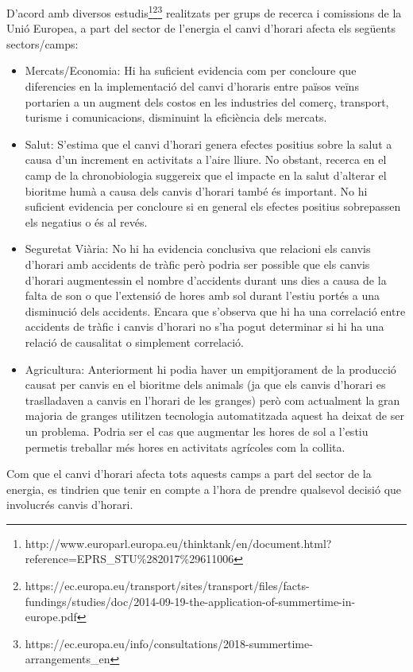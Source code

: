 \documentclass{article}
\begin{document}
D'acord amb diversos estudis\footnote{http://www.europarl.europa.eu/thinktank/en/document.html?reference=EPRS\_STU\%282017\%29611006}\footnote{https://ec.europa.eu/transport/sites/transport/files/facts-fundings/studies/doc/2014-09-19-the-application-of-summertime-in-europe.pdf}\footnote{\label{eu-consultation}https://ec.europa.eu/info/consultations/2018-summertime-arrangements\_en} realitzats per grups de recerca i comissions de la Unió Europea, a part del sector de l'energia el canvi d'horari afecta els següents sectors/camps:
\begin{itemize}
    \item Mercats/Economia: Hi ha suficient evidencia com per concloure que diferencies en la implementació del canvi d'horaris entre països veïns portarien a un augment dels costos en les industries del comerç, transport, turisme i comunicacions, disminuint la eficiència dels mercats.
    \item Salut: S'estima que el canvi d'horari genera efectes positius sobre la salut a causa d'un increment en activitats a l'aire lliure. No obstant, recerca en el camp de la chronobiologia suggereix que el impacte en la salut d'alterar el bioritme humà a causa dels canvis d'horari també és important. No hi suficient evidencia per concloure si en general els efectes positius sobrepassen els negatius o és al revés.
    \item Seguretat Viària: No hi ha evidencia conclusiva que relacioni els canvis d'horari amb accidents de tràfic però podria ser possible que els canvis d'horari augmentessin el nombre d'accidents durant uns dies a causa de la falta de son o que l'extensió de hores amb sol durant l'estiu portés a una disminució dels accidents. Encara que s'observa que hi ha una correlació entre accidents de tràfic i canvis d'horari no s'ha pogut determinar si hi ha una relació de causalitat o simplement correlació.
    \item Agricultura: Anteriorment hi podia haver un empitjorament de la producció causat per canvis en el bioritme dels animals (ja que els canvis d'horari es traslladaven a canvis en l'horari de les granges) però com actualment la gran majoria de granges utilitzen tecnologia automatitzada aquest ha deixat de ser un problema. Podria ser el cas que augmentar les hores de sol a l'estiu permetis treballar més hores en activitats agrícoles com la collita. 
\end{itemize}

Com que el canvi d'horari afecta tots aquests camps a part del sector de la energia, es tindrien que tenir en compte a l'hora de prendre qualsevol decisió que involucrés canvis d'horari.
\end{document}

